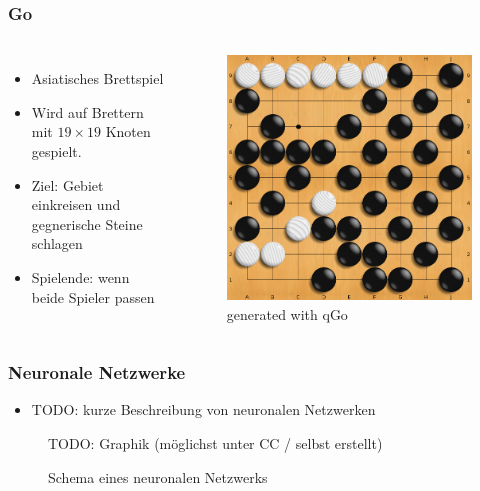 \begin{frame}
    \frametitle{Go}
    \begin{columns}
        \begin{itemize}
            \item Asiatisches Brettspiel
            \item Wird auf Brettern mit $19 \times 19$ Knoten gespielt.
            \item Ziel: Gebiet einkreisen und gegnerische Steine schlagen
            \item Spielende: wenn beide Spieler passen
        \end{itemize}
        \begin{figure}
            \centering
            \includegraphics[scale=0.25]{content/img/go_board}
            \caption{generated with qGo}
        \end{figure}
    \end{columns}
\end{frame}

\begin{frame}
    \frametitle{Neuronale Netzwerke}
    \begin{itemize}
        \item TODO: kurze Beschreibung von neuronalen Netzwerken
    \end{itemize}
    \begin{figure}
        TODO: Graphik (möglichst unter CC / selbst erstellt)
        \caption{Schema eines neuronalen Netzwerks}
    \end{figure}
\end{frame}
